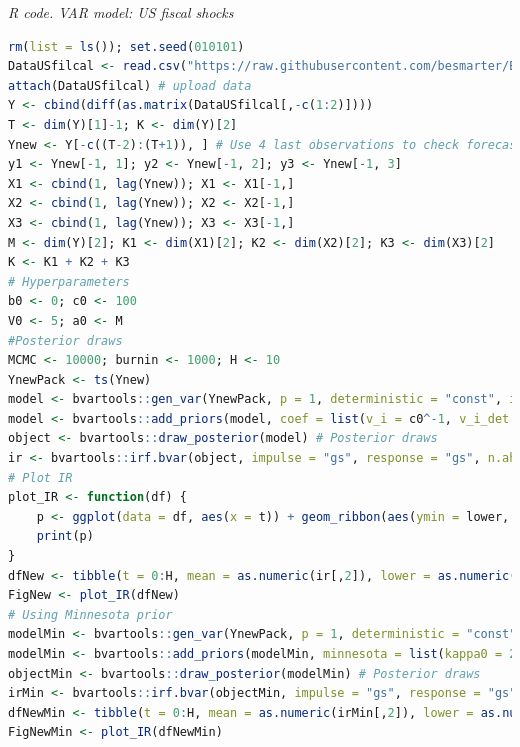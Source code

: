 \begin{tcolorbox}[enhanced,width=4.67in,center upper,
	fontupper=\large\bfseries,drop shadow southwest,sharp corners]
	\textit{R code. VAR model: US fiscal shocks}
	\begin{VF}
		\begin{lstlisting}[language=R]
rm(list = ls()); set.seed(010101)
DataUSfilcal <- read.csv("https://raw.githubusercontent.com/besmarter/BSTApp/refs/heads/master/DataApp/18USAfiscal.csv", sep = ",", header = TRUE, quote = "")
attach(DataUSfilcal) # upload data
Y <- cbind(diff(as.matrix(DataUSfilcal[,-c(1:2)])))
T <- dim(Y)[1]-1; K <- dim(Y)[2]
Ynew <- Y[-c((T-2):(T+1)), ] # Use 4 last observations to check forecast
y1 <- Ynew[-1, 1]; y2 <- Ynew[-1, 2]; y3 <- Ynew[-1, 3]
X1 <- cbind(1, lag(Ynew)); X1 <- X1[-1,]
X2 <- cbind(1, lag(Ynew)); X2 <- X2[-1,]
X3 <- cbind(1, lag(Ynew)); X3 <- X3[-1,]
M <- dim(Y)[2]; K1 <- dim(X1)[2]; K2 <- dim(X2)[2]; K3 <- dim(X3)[2] 
K <- K1 + K2 + K3
# Hyperparameters
b0 <- 0; c0 <- 100
V0 <- 5; a0 <- M
#Posterior draws
MCMC <- 10000; burnin <- 1000; H <- 10
YnewPack <- ts(Ynew)
model <- bvartools::gen_var(YnewPack, p = 1, deterministic = "const", iterations = MCMC, burnin = burnin) # Create model
model <- bvartools::add_priors(model, coef = list(v_i = c0^-1, v_i_det = c0^-1, const = b0), sigma = list(df = a0, scale = V0), coint_var = FALSE) # Add priors
object <- bvartools::draw_posterior(model) # Posterior draws
ir <- bvartools::irf.bvar(object, impulse = "gs", response = "gs", n.ahead = H, type = "feir") # Calculate IR
# Plot IR
plot_IR <- function(df) {
	p <- ggplot(data = df, aes(x = t)) + geom_ribbon(aes(ymin = lower, ymax = upper), alpha = 1, fill = "lightblue") + geom_line(aes(y = mean), colour = "blue", linewidth = 0.5) + ylab("Impulse response") + xlab("Time") + xlim(0,H)
	print(p)
}
dfNew <- tibble(t = 0:H, mean = as.numeric(ir[,2]), lower = as.numeric(ir[,1]), upper = as.numeric(ir[,3]))
FigNew <- plot_IR(dfNew)
# Using Minnesota prior
modelMin <- bvartools::gen_var(YnewPack, p = 1, deterministic = "const", iterations = MCMC, burnin = burnin)
modelMin <- bvartools::add_priors(modelMin, minnesota = list(kappa0 = 2, kappa1 = 0.5, kappa3 = 5), coint_var = FALSE) # Minnesota prior
objectMin <- bvartools::draw_posterior(modelMin) # Posterior draws
irMin <- bvartools::irf.bvar(objectMin, impulse = "gs", response = "gs", n.ahead = H, type = "oir") # Calculate IR
dfNewMin <- tibble(t = 0:H, mean = as.numeric(irMin[,2]), lower = as.numeric(irMin[,1]), upper = as.numeric(irMin[,3]))
FigNewMin <- plot_IR(dfNewMin)
\end{lstlisting}
	\end{VF}
\end{tcolorbox} 

